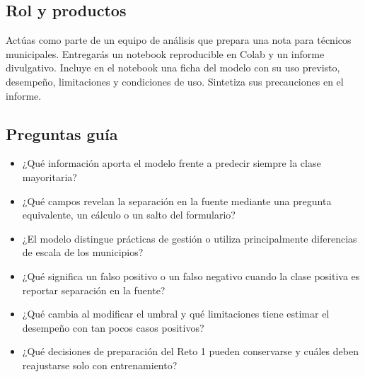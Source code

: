 \documentclass[a4,11pt]{aleph-notas}
\begin{document}
\subsection*{Rol y productos}
Actúas como parte de un equipo de análisis que prepara una nota para técnicos municipales. Entregarás un notebook reproducible en Colab y un informe divulgativo. Incluye en el notebook una ficha del modelo con su uso previsto, desempeño, limitaciones y condiciones de uso. Sintetiza sus precauciones en el informe.

\subsection*{Preguntas guía}
\begin{itemize}[leftmargin=*]
    \item ¿Qué información aporta el modelo frente a predecir siempre la clase mayoritaria?
    \item ¿Qué campos revelan la separación en la fuente mediante una pregunta equivalente, un cálculo o un salto del formulario?
    \item ¿El modelo distingue prácticas de gestión o utiliza principalmente diferencias de escala de los municipios?
    \item ¿Qué significa un falso positivo o un falso negativo cuando la clase positiva es reportar separación en la fuente?
    \item ¿Qué cambia al modificar el umbral y qué limitaciones tiene estimar el desempeño con tan pocos casos positivos?
    \item ¿Qué decisiones de preparación del Reto 1 pueden conservarse y cuáles deben reajustarse solo con entrenamiento?
\end{itemize}
\end{document}
